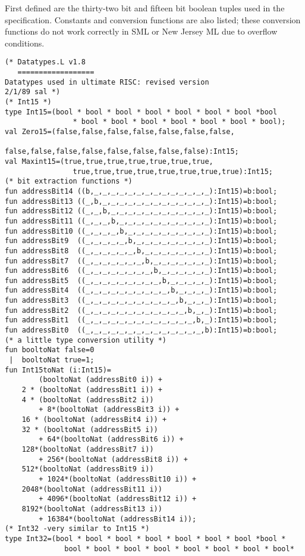 First  defined are the thirty-two bit and fifteen bit boolean tuples used
in the specification.
Constants and conversion functions are also listed; these conversion functions do not work correctly in SML or New Jersey ML due to overflow conditions.
\begin{verbatim}
(* Datatypes.L v1.8
   ==================
Datatypes used in ultimate RISC: revised version
2/1/89 sal *)
(* Int15 *)
type Int15=(bool * bool * bool * bool * bool * bool * bool *bool
                * bool * bool * bool * bool * bool * bool * bool);
val Zero15=(false,false,false,false,false,false,false,
                false,false,false,false,false,false,false,false):Int15;
val Maxint15=(true,true,true,true,true,true,true,
                true,true,true,true,true,true,true,true):Int15;
(* bit extraction functions *)
fun addressBit14 ((b,_,_,_,_,_,_,_,_,_,_,_,_,_,_):Int15)=b:bool;
fun addressBit13 ((_,b,_,_,_,_,_,_,_,_,_,_,_,_,_):Int15)=b:bool;
fun addressBit12 ((_,_,b,_,_,_,_,_,_,_,_,_,_,_,_):Int15)=b:bool;
fun addressBit11 ((_,_,_,b,_,_,_,_,_,_,_,_,_,_,_):Int15)=b:bool;
fun addressBit10 ((_,_,_,_,b,_,_,_,_,_,_,_,_,_,_):Int15)=b:bool;
fun addressBit9  ((_,_,_,_,_,b,_,_,_,_,_,_,_,_,_):Int15)=b:bool;
fun addressBit8  ((_,_,_,_,_,_,b,_,_,_,_,_,_,_,_):Int15)=b:bool;
fun addressBit7  ((_,_,_,_,_,_,_,b,_,_,_,_,_,_,_):Int15)=b:bool;
fun addressBit6  ((_,_,_,_,_,_,_,_,b,_,_,_,_,_,_):Int15)=b:bool;
fun addressBit5  ((_,_,_,_,_,_,_,_,_,b,_,_,_,_,_):Int15)=b:bool;
fun addressBit4  ((_,_,_,_,_,_,_,_,_,_,b,_,_,_,_):Int15)=b:bool;
fun addressBit3  ((_,_,_,_,_,_,_,_,_,_,_,b,_,_,_):Int15)=b:bool;
fun addressBit2  ((_,_,_,_,_,_,_,_,_,_,_,_,b,_,_):Int15)=b:bool;
fun addressBit1  ((_,_,_,_,_,_,_,_,_,_,_,_,_,b,_):Int15)=b:bool;
fun addressBit0  ((_,_,_,_,_,_,_,_,_,_,_,_,_,_,b):Int15)=b:bool;
(* a little type conversion utility *)
fun booltoNat false=0
 |  booltoNat true=1;
fun Int15toNat (i:Int15)=
        (booltoNat (addressBit0 i)) + 
	2 * (booltoNat (addressBit1 i)) +
	4 * (booltoNat (addressBit2 i))
        + 8*(booltoNat (addressBit3 i)) +
	16 * (booltoNat (addressBit4 i)) +
	32 * (booltoNat (addressBit5 i))
        + 64*(booltoNat (addressBit6 i)) +
	128*(booltoNat (addressBit7 i))
        + 256*(booltoNat (addressBit8 i)) +
	512*(booltoNat (addressBit9 i))
        + 1024*(booltoNat (addressBit10 i)) +
	2048*(booltoNat (addressBit11 i))
        + 4096*(booltoNat (addressBit12 i)) +
	8192*(booltoNat (addressBit13 i))
        + 16384*(booltoNat (addressBit14 i));
(* Int32 -very similar to Int15 *)
type Int32=(bool * bool * bool * bool * bool * bool * bool *bool *
              bool * bool * bool * bool * bool * bool * bool * bool*

\end{verbatim}
